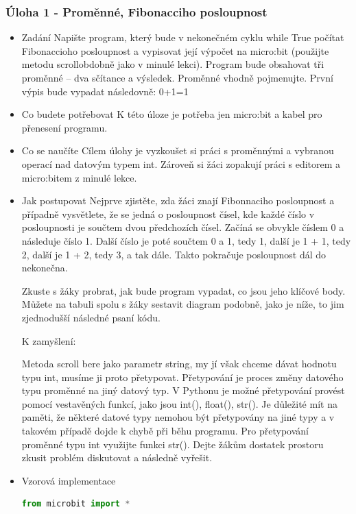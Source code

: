 \documentclass[
  digital,     %
  oneside,     %
  nosansbold,  %
  colorbold, %
  lof,         %
  nolot,         %
]{fithesis4}
\begin{document}
\subsubsection{Úloha 1 - Proměnné, Fibonacciho posloupnost}
\begin{itemize}
    \item Zadání
Napište program, který bude v nekonečném cyklu while True počítat Fibonaccioho posloupnost a vypisovat její výpočet na micro:bit (použijte metodu scrollobdobně jako v minulé lekci). Program bude obsahovat tři proměnné – dva sčítance a výsledek. Proměnné vhodně pojmenujte. První výpis bude vypadat následovně: 0+1=1
    \item Co budete potřebovat
K této úloze je potřeba jen micro:bit a kabel pro přenesení programu.
    \item Co se naučíte
Cílem úlohy je vyzkoušet si práci s proměnnými a vybranou operací nad datovým typem int. Zároveň si žáci zopakují práci s editorem a micro:bitem z minulé lekce.
\item Jak postupovat
Nejprve zjistěte, zda žáci znají Fibonnaciho posloupnost a případně vysvětlete, že se jedná o posloupnost čísel, kde každé číslo v posloupnosti je součtem dvou předchozích čísel. Začíná se obvykle číslem 0 a následuje číslo 1. Další číslo je poté součtem 0 a 1, tedy 1, další je 1 + 1, tedy 2, další je 1 + 2, tedy 3, a tak dále. Takto pokračuje posloupnost dál do nekonečna.

Zkuste s žáky probrat, jak bude program vypadat, co jsou jeho klíčové body. Můžete na tabuli spolu s žáky sestavit diagram podobně, jako je níže, to jim zjednodušší následné psaní kódu.

K zamyšlení:

Metoda scroll bere jako parametr string, my jí však chceme dávat hodnotu typu int, musíme ji proto přetypovat. Přetypování je proces změny datového typu proměnné na jiný datový typ. V Pythonu je možné přetypování provést pomocí vestavěných funkcí, jako jsou int(), float(), str(). Je důležité mít na paměti, že některé datové typy nemohou být přetypovány na jiné typy a v takovém případě dojde k chybě při běhu programu. Pro přetypování proměnné typu int využijte funkci str(). Dejte žákům dostatek prostoru zkusit problém diskutovat a následně vyřešit.
    \item Vzorová implementace
\begin{lstlisting}[language=Python, caption=Úloha 1 - Hello World]
from microbit import * 


\end{lstlisting}
\end{itemize}
\end{document}
